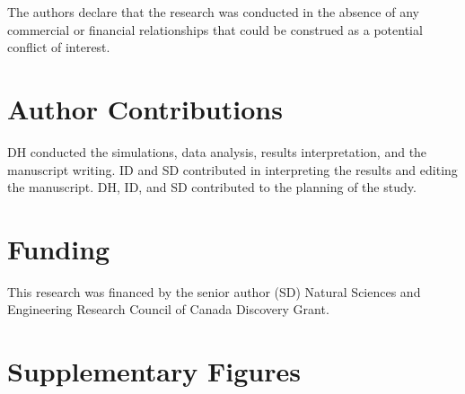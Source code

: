 \documentclass[utf8]{frontiersSCNS}\usepackage[]{graphicx}\usepackage[]{color}
\begin{document}
The authors declare that the research was conducted in the absence of any
commercial or financial relationships that could be construed as a potential
conflict of interest.

\section*{Author Contributions}

DH conducted the simulations, data analysis, results interpretation, and the
manuscript writing.
ID and SD contributed in interpreting the results and editing the manuscript.
DH, ID, and SD contributed to the planning of the study.

\section*{Funding}

This research was financed by the senior author (SD) Natural Sciences and
Engineering Research Council of Canada Discovery Grant.


\section*{Supplementary Figures}
\end{document}
